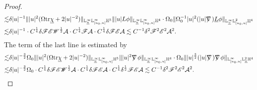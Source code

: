 \documentclass[11pt,reqno]{amsart}
\theoremstyle{definition}
\numberwithin{equation}{section}
\newcommand{\tr}{\mathrm{tr}}
\renewcommand{\L}{\mathbb{L}}
\renewcommand{\H}{\mathbb{H}}
\def\chib{\underline{\chi}}
\def\Lb{\underline{L}}
\def\tr{\mathrm{tr}}
\def\ub{\underline{u}}
\def\nablas{\mbox{$\nabla \mkern -13mu /$ }}
\begin{document}
\begin{proof}
\begin{align*}
\lesssim&\delta|u|^{-1}\||u|^2(\Omega\tr\chib+2|u|^{-2})\|_{\L^\infty_{\ub}\L^\infty_{[u_0,u]}\H^5}\||u|L\phi\|_{\L^\infty_{\ub}\L^\infty_{[u_0,u]}\H^4}\cdot\Omega_0\|\Omega_0^{-1}|u|^2(|u|\nablas)\Lb\phi\|_{\L^\infty_{\ub}\L^2_{[u_0,u]}\H^4}\\
\lesssim& \delta|u|^{-1}\cdot C^{\frac{1}{4}}\delta\mathscr{F}\mathscr{E}\mathscr{W}^{\frac{1}{2}}\mathcal{A}\cdot C^{\frac{1}{4}}\mathscr{F}\mathcal{A}\cdot C^{\frac{1}{4}}\delta\mathscr{F}\mathscr{E}\mathcal{A}\lesssim C^{-1}\delta^2\mathscr{F}^2\mathscr{E}^2\mathcal{A}^2.
\end{align*}
The  term of the last line is estimated by
\begin{align*}
\lesssim&\delta|u|^{-\frac{3}{2}}\Omega_0\||u|^2(\Omega\tr\chib+2|u|^{-2})\|_{\L^\infty_{\ub}\L^\infty_{[u_0,u]}\H^5}\||u|^2\nablas\phi\|_{\L^\infty_{\ub}\L^\infty_{[u_0,u]}\H^4}\cdot \Omega_0\||u|^\frac{3}{2}(|u|\nablas)\nablas\phi\|_{\L^\infty_{[u_0,u]}\L^2_{\ub}\H^4}\\
\lesssim& \delta|u|^{-\frac{3}{2}}\Omega_0\cdot C^{\frac{1}{4}}\delta\mathscr{F}\mathscr{E}\mathscr{W}^{\frac{1}{2}}\mathcal{A}\cdot C^{\frac{1}{4}}\delta\mathscr{F}\mathscr{E}\mathcal{A}\cdot C^{\frac{1}{4}}\delta^{\frac{1}{2}}\mathscr{F}\mathscr{E}\mathcal{A}\lesssim C^{-1}\delta^2\mathscr{F}^2\mathscr{E}^2\mathcal{A}^2.
\end{align*}


\end{proof}
\end{document}
